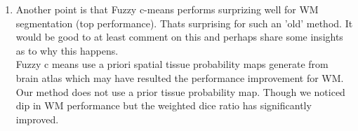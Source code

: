 \documentclass{article}
\begin{document}
\begin{enumerate}
\item Another point is that Fuzzy c-means performs surprizing well for WM segmentation (top performance). Thats surprising for such an 'old' method. It would be good to at least comment on this and perhaps share some insights as to why this happens. \\

Fuzzy c means use a priori spatial tissue probability maps generate from brain atlas which may have resulted the performance improvement for WM. Our method does not use a prior tissue probability map. Though we noticed dip in WM performance but the  weighted dice ratio has significantly improved. 

\end{enumerate}
\end{document}
